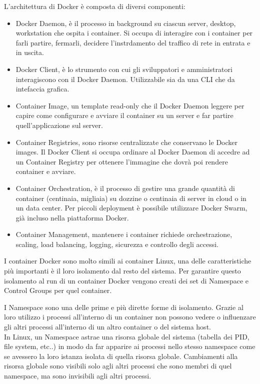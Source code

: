 \documentclass[12pt,a4paper]{article}
\begin{document}
L'architettura di Docker è composta di diversi componenti:
\begin{itemize}
    \item Docker Daemon, è il processo in background su ciascun server, desktop, workstation che ospita i container. Si occupa di interagire con i container per farli partire, fermarli, decidere l'instrdamento del traffico di rete in entrata e in uscita.
    \item Docker Client, è lo strumento con cui gli sviluppatori e amministratori interagiscono con il Docker Daemon. Utilizzabile sia da una CLI che da intefaccia grafica.
    \item Container Image, un template read-only che il Docker Daemon leggere per capire come configurare e avviare il container su un server e far partire quell'applicazione sul server.
    \item Container Registries, sono risorse centralizzate che conservano le Docker images. Il Docker Client si occupa ordinare al Docker Daemon di accedre ad un Container Registry per ottenere l'immagine che dovrà poi rendere container e avviare.
    \item Container Orchestration, è il processo di gestire una grande quantità di container (centinaia, migliaia) su dozzine o centinaia di server in cloud o in un data center. Per piccoli deployment è possibile utilizzare Docker Swarm, già incluso nella piattaforma Docker.
    \item Container Management, mantenere i container richiede orchestrazione, scaling, load balancing, logging, sicurezza e controllo degli accessi. \cite{oracle_docker}
\end{itemize}

I container Docker sono molto simili ai container Linux, una delle caratteristiche più importanti è il loro isolamento dal resto del sistema. Per garantire questo isolamento al run di un container Docker vengono creati dei set di Namespace e Control Groups per quel container.

I Namespace sono una delle prime e più dirette forme di isolamento. Grazie al loro utilizzo i processi all'interno di un container non possono vedere o influenzare gli altri processi all'interno di un altro container o del sistema host.\cite{docker_documentazione_security}\\ In Linux, un Namespace astrae una risorsa globale del sistema (tabella dei PID, file system, etc..) in modo da far apparire ai processi nello stesso namespace come se avessero la loro istanza isolata di quella risorsa globale. Cambiamenti alla risorsa globale sono visibili solo agli altri processi che sono membri di quel namespace, ma sono invisibili agli altri processi.\cite{man_namespaces}
\end{document}
